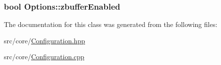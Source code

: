 \hypertarget{classOptions_a207bda167cf74bb2b22c00506a754f93}{
\subsubsection[{zbuffer\-Enabled}]{\setlength{\rightskip}{0pt plus 5cm}bool {\bf \-Options\-::zbuffer\-Enabled}}}\label{classOptions_a207bda167cf74bb2b22c00506a754f93}


\-The documentation for this class was generated from the following files\-:\begin{DoxyCompactItemize}
\item 
src/core/\hyperlink{Configuration_8hpp}{\-Configuration.\-hpp}\item 
src/core/\hyperlink{Configuration_8cpp}{\-Configuration.\-cpp}\end{DoxyCompactItemize}
